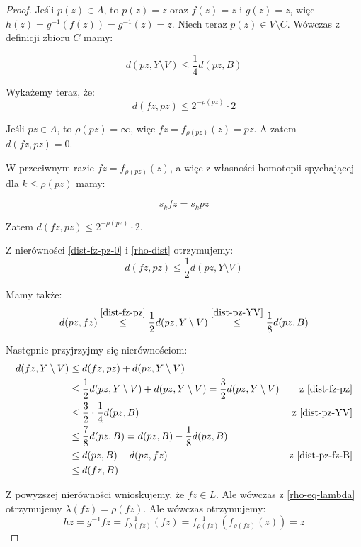 \begin{lem}
\begin{proof}
    Jeśli $p(z) \in A$, to $p(z) = z$ oraz $f(z) = z$ i $g(z) = z$, więc $h(z) = g^{-1}(f(z)) = g^{-1}(z) = z$. Niech teraz $p(z) \in V \setminus C$. Wówczas z definicji zbioru $C$ mamy:
    
    \begin{equation}
      \label{dist-pz-YV} d(pz, Y \setminus V) \leq \frac{1}{4} d(pz, B)
    \end{equation}
    
    Wykażemy teraz, że:
    \begin{equation}
      \label{dist-fz-pz-0}d(fz, pz) \leq 2^{-\rho(pz)} \cdot 2
    \end{equation}
    
    Jeśli $pz \in A$, to $\rho(pz) = \infty$, więc $fz = f_{\rho(pz)}(z) = pz$. A zatem $d(fz, pz) = 0$.
    
    W przeciwnym razie $fz = f_{\rho(pz)}(z)$, a więc z własności homotopii spychającej dla $k \leq \rho(pz)$ mamy:
    
    \[s_k fz = s_k pz\]
    
    Zatem $d(fz, pz) \leq 2^{-\rho(pz)} \cdot 2$.
    
    Z nierówności \eqref{dist-fz-pz-0} i \eqref{rho-dist} otrzymujemy:
    \begin{equation}
      \label{dist-fz-pz} d(fz, pz) \leq \frac{1}{2} d(pz, Y \setminus V)
    \end{equation}
    
    Mamy także:
    \begin{equation}
      \label{dist-pz-fz-B} d(pz, fz) \overset{\eqref{dist-fz-pz}}{\leq} \frac{1}{2} d(pz, Y \setminus V) \overset{\eqref{dist-pz-YV}}{\leq} \frac{1}{8} d(pz, B)
    \end{equation}


    Następnie przyjrzyjmy się nierównościom:
    \begin{align*}
      d(fz, Y \setminus V) & \leq d(fz, pz) + d(pz, Y \setminus V) \\
      & \leq \frac{1}{2} d(pz, Y \setminus V) + d(pz, Y \setminus V) = \frac{3}{2} d(pz, Y \setminus V) & \mbox{z \eqref{dist-fz-pz}} \\
      & \leq \frac{3}{2} \cdot \frac{1}{4} d(pz, B) & \mbox{z \eqref{dist-pz-YV}} \\
      & \leq \frac{7}{8} d(pz, B) = d(pz, B) - \frac{1}{8} d(pz, B) \\
      & \leq d(pz, B) - d(pz, fz) & \mbox{z \eqref{dist-pz-fz-B}} \\
      & \leq d(fz, B)
    \end{align*}
    
    Z powyższej nierówności wnioskujemy, że $fz \in L$. Ale wówczas z \eqref{rho-eq-lambda} otrzymujemy $\lambda(fz) = \rho(fz)$. Ale wówczas otrzymujemy:
    \[hz = g^{-1}fz = f^{-1}_{\lambda(fz)}(fz) = f^{-1}_{\rho(fz)}(f_{\rho(fz)}(z)) = z\]
  \end{proof}

\end{lem}

